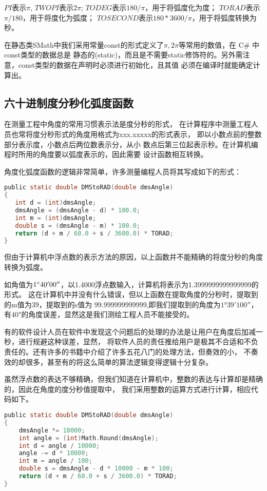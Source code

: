 $PI$表示$\pi$, $TWOPI$表示$2\pi$;
$TODEG$表示$180/\pi$，用于将弧度化为度；
$TORAD$表示$\pi/180$，用于将度化为弧度；
$TOSECOND$表示$180*3600/\pi$，用于将弧度转换为秒。

在静态类SMath中我们采用常量const的形式定义了$\pi, 2\pi$等常用的数值，在 C\# 中 const类型的数据总是
静态的(static)，而且是不需要static修饰符的。另外需注意，const类型的数据在声明时必须进行初始化，且其值
必须在编译时就能确定计算出。

\subsection{六十进制度分秒化弧度函数}

 在测量工程中角度的常用习惯表示法是度分秒的形式，
 在计算程序中测量工程人员也常将度分秒形式的角度用格式为xxx.xxxxx的形式表示，
 即以小数点前的整数部分表示度，小数点后两位数表示分，从小
 数点后第三位起表示秒。在计算机编程时所用的角度要以弧度表示的，因此需要
 设计函数相互转换。

 
角度化弧度函数的逻辑非常简单，许多测量编程人员将其写成如下的形式：

\begin{lstlisting}[language=C]
public static double DMStoRAD(double dmsAngle)
{
   int d = (int)dmsAngle;
   dmsAngle = (dmsAngle - d) * 100.0;
   int m = (int)dmsAngle;
   double s = (dmsAngle - m) * 100.0;
   return (d + m / 60.0 + s / 3600.0) * TORAD;
}
\end{lstlisting}

但由于计算机中浮点数的表示方法的原因，以上函数并不能精确的将度分秒的角度转换为弧度。

 如角值为$1^\circ 40'00''$，以1.4000浮点数输入，计算机将表示为1.3999999999999999的形式。
 这在计算机中并没有什么错误，但以上函数在提取角度的分秒时，提取到的m值为39，提取到的s值为
 99.999999999999,即我们提取到的角度为$1°39'100''$，有40"的角度误差，显然这是我们测绘工程人员不能接受的。
 
 有的软件设计人员在软件中发现这个问题后的处理的办法是让用户在角度后加减一秒，进行规避这种误差，显然，
 将软件人员的责任推给用户是极其不合适和不负责任的。还有许多的书籍中介绍了许多五花八门的处理方法，但奏效的小，
 不奏效的却很多，甚至有的将这么简单的算法逻辑变得逻辑十分复杂。
 
 虽然浮点数的表达不够精确，但我们知道在计算机中，整数的表达与计算却是精确的，因此在角度的度分秒值提取中，
 我们采用整数的运算方式进行计算，相应代码如下。
 
\begin{lstlisting}[language=C]
public static double DMStoRAD(double dmsAngle)
{
    dmsAngle *= 10000; 
    int angle = (int)Math.Round(dmsAngle);
    int d = angle / 10000;
    angle -= d * 10000;
    int m = angle / 100;
    double s = dmsAngle - d * 10000 - m * 100;
    return (d + m / 60.0 + s / 3600.0) * TORAD;
}
\end{lstlisting}

